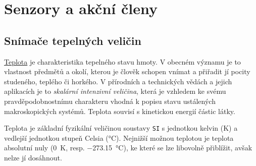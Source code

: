 \setchaptertoc
\chapter{Senzory a akční členy}
  \section{Snímače tepelných veličin}
    \href{http://cs.wikipedia.org/wiki/Teplota}{Teplota} je charakteristika tepelného stavu hmoty.
    V obecném významu je to vlastnost předmětů a okolí, kterou je člověk schopen vnímat a přiřadit
    jí pocity studeného, teplého či horkého. V přírodních a technických vědách a jejich aplikacích
    je to \emph{skalární intenzivní veličina}, která je vzhledem ke svému pravděpodobnostnímu
    charakteru vhodná k popisu stavu ustálených makroskopických systémů. Teplota souvisí s
    kinetickou energií částic látky.

    Teplota je základní fyzikální veličinou soustavy \texttt{SI} s jednotkou kelvin (\si{\kelvin}) a
    vedlejší jednotkou stupeň Celsia (\si{\degreeCelsius}). Nejnižší možnou teplotou je teplota
    absolutní nuly (\SI{0}{\kelvin}, resp. \SI{-273.15}{\degreeCelsius}), ke které se lze libovolně
    přiblížit, avšak nelze jí dosáhnout.
         
